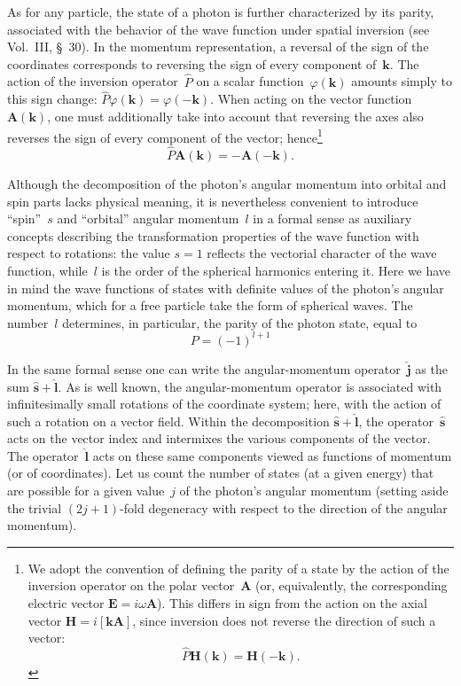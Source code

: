 As for any particle, the state of a photon is further characterized by its parity, associated with the behavior of the wave function under spatial inversion (see Vol.~III, \S~30). In the momentum representation, a reversal of the sign of the coordinates corresponds to reversing the sign of every component of~$\mathbf{k}$. The action of the inversion operator~$\hat{P}$ on a scalar function~$\varphi(\mathbf{k})$ amounts simply to this sign change: $\hat{P}\varphi(\mathbf{k}) = \varphi(-\mathbf{k})$. When acting on the vector function~$\mathbf{A}(\mathbf{k})$, one must additionally take into account that reversing the axes also reverses the sign of every component of the vector; hence\footnote{We adopt the convention of defining the parity of a state by the action of the inversion operator on the polar vector~$\mathbf{A}$ (or, equivalently, the corresponding electric vector $\mathbf{E} = i\omega\mathbf{A}$). This differs in sign from the action on the axial vector $\mathbf{H} = i[\mathbf{kA}]$, since inversion does not reverse the direction of such a vector:
\[
\hat{P}\mathbf{H}(\mathbf{k}) = \mathbf{H}(-\mathbf{k}).
\]}
\begin{equation}
\hat{P}\mathbf{A}(\mathbf{k}) = -\mathbf{A}(-\mathbf{k}).
\tag{6.1}
\end{equation}

Although the decomposition of the photon's angular momentum into orbital and spin parts lacks physical meaning, it is nevertheless convenient to introduce ``spin''~$s$ and ``orbital'' angular momentum~$l$ in a formal sense as auxiliary concepts describing the transformation properties of the wave function with respect to rotations: the value $s = 1$ reflects the vectorial character of the wave function, while~$l$ is the order of the spherical harmonics entering it. Here we have in mind the wave functions of states with definite values of the photon's angular momentum, which for a free particle take the form of spherical waves. The number~$l$ determines, in particular, the parity of the photon state, equal to
\begin{equation}
P = (-1)^{l+1}
\tag{6.2}
\end{equation}

In the same formal sense one can write the angular-momentum operator~$\hat{\mathbf{j}}$ as the sum $\hat{\mathbf{s}}+\hat{\mathbf{l}}$. As is well known, the angular-momentum operator is associated with infinitesimally small rotations of the coordinate system; here, with the action of such a rotation on a vector field. Within the decomposition $\hat{\mathbf{s}} + \hat{\mathbf{l}}$, the operator~$\hat{\mathbf{s}}$ acts on the vector index and intermixes the various components of the vector. The operator~$\hat{\mathbf{l}}$ acts on these same components viewed as functions of momentum (or of coordinates).
Let us count the number of states (at a given energy) that are possible for a given value~$j$ of the photon's angular momentum (setting aside the trivial $(2j+1)$-fold degeneracy with respect to the direction of the angular momentum).

